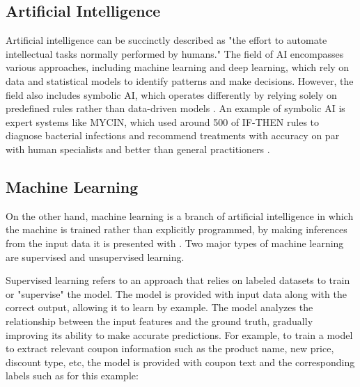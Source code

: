\documentclass[licencjacka,en]{pracamgr}
\begin{document}
\subsection{Artificial Intelligence}
Artificial intelligence can be succinctly described as "the effort to automate intellectual tasks normally performed by humans." The field of AI encompasses various approaches, including machine learning and deep learning, which rely on data and statistical models to identify patterns and make decisions. However, the field also includes symbolic AI, which operates differently by relying solely on predefined rules rather than data-driven models \cite{francuz_2}. An example of symbolic AI is expert systems like MYCIN, which used around 500 of IF-THEN rules to diagnose bacterial infections and recommend treatments with accuracy on par with human specialists and better than general practitioners \cite{mycin}.

\subsection{Machine Learning}
On the other hand, machine learning is a branch of artificial intelligence in which the machine is trained rather than explicitly programmed, by making inferences from the input data it is presented with \cite{francuz_3}. Two major types of machine learning are supervised and unsupervised learning. 

Supervised learning refers to an approach that relies on labeled datasets to train or "supervise" the model. The model is provided with input data along with the correct output, allowing it to learn by example. The model analyzes the relationship between the input features and the ground truth, gradually improving its ability to make accurate predictions. For example, to train a model to extract relevant coupon information such as the product name, new price, discount type, etc, the model is provided with coupon text and the corresponding labels such as for this example: 
\end{document}
